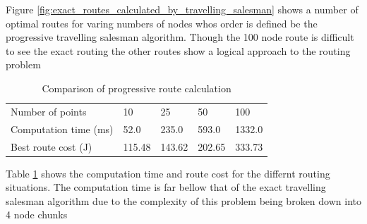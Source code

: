 \documentclass[a4paper,12pt,twoside]{article}
\begin{document}
Figure \ref{fig:exact_routes_calculated_by_travelling_salesman} shows a number of optimal routes for varing numbers of nodes whos order is defined be the progressive travelling salesman algorithm. Though the 100 node route is difficult to see the exact routing the other routes show a logical approach to the routing problem

\begin{table}[width=\textwidth]
\centering
    \begin{tabular}{lllll}
    Number of points	& 10	& 25	& 50	& 100	\\
Computation time (ms)	& 52.0	& 235.0	& 593.0	& 1332.0	\\
Best route cost (J)	& 115.48	& 143.62	& 202.65	& 333.73	\\

    \end{tabular}
\caption{Comparison of progressive route calculation}
\label{tbl:comparison_of_progressive_route_calculation}
\end{table}

Table \ref{tbl:comparison_of_progressive_route_calculation} shows the computation time and route cost for the differnt routing situations. The computation time is far bellow that of the exact travelling salesman algorithm due to the complexity of this problem being broken down into 4 node chunks
\end{document}
